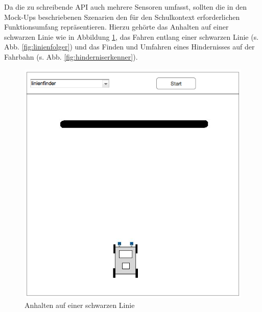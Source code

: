 \documentclass[paper=a4, pagesize, DIV=calc, BCOR=15.5mm, twoside=on, onecolumn=on, open = right, titlepage =on, parskip =half-, headsepline = on, footsepline = on, chapterprefix = on, appendixprefix = off, fontsize = 12pt, numbers = noenddot, abstract = on]{scrbook}
\numberwithin{equation}{chapter}
\theoremstyle{definition}
\theoremstyle{plain}
\theoremstyle{plain}
\theoremstyle{remark}
\theoremstyle{plain}
\theoremstyle{plain}
\begin{document}
Da die zu schreibende API auch mehrere Sensoren umfasst, sollten die in den Mock-Ups beschriebenen Szenarien den für den Schulkontext erforderlichen Funktionsumfang repräsentieren. Hierzu gehörte das Anhalten auf einer schwarzen Linie wie in Abbildung \ref{fig:linienfinder}, das Fahren entlang einer schwarzen Linie (s. Abb. \ref{fig:linienfolger}) und das Finden und Umfahren eines Hindernisses auf der Fahrbahn (s. Abb. \ref{fig:hinderniserkenner}).

\begin{figure}[htbp]
\centering
\includegraphics[scale=0.4]{images/mockup_linienfinder.png}
\caption{Anhalten auf einer schwarzen Linie}
\label{fig:linienfinder}
\end{figure}
\end{document}
